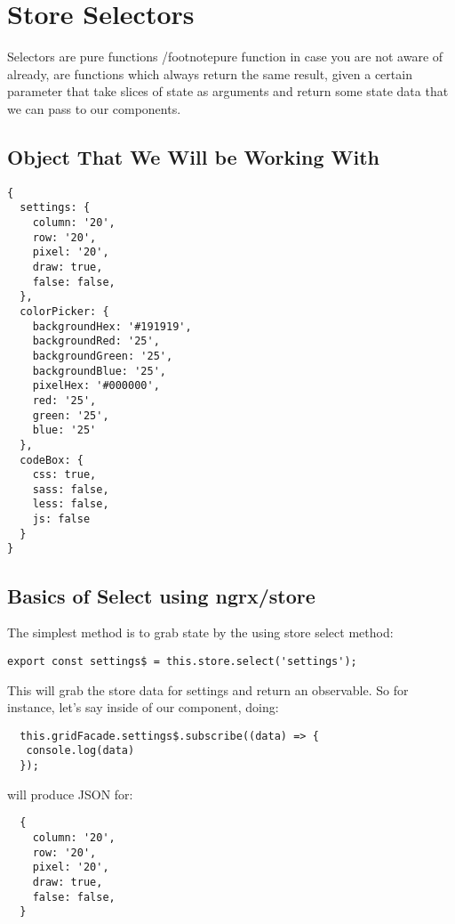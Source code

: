 \maketitle{}
\section{ Store Selectors }

Selectors are pure functions /footnote{pure function in case you are not aware
of already, are functions which always return the same result, given a certain
parameter} that take slices of state as arguments and return some state data
that we can pass to our components.


\subsection{Object That We Will be Working With}
\begin{verbatim}
{
  settings: {
    column: '20',
    row: '20',
    pixel: '20',
    draw: true,
    false: false,
  },
  colorPicker: {
    backgroundHex: '#191919',
    backgroundRed: '25',
    backgroundGreen: '25',
    backgroundBlue: '25',
    pixelHex: '#000000',
    red: '25',
    green: '25',
    blue: '25'
  },
  codeBox: {
    css: true,
    sass: false,
    less: false,
    js: false
  }
}
\end{verbatim}

\subsection{Basics of Select using ngrx/store}

The simplest method is to grab state by the using store select method:
\begin{lstlisting}
export const settings$ = this.store.select('settings');
\end{lstlisting}

This will grab the store data for settings and return an observable. So for
instance, let's say inside of our component, doing:
\begin{lstlisting}
  this.gridFacade.settings$.subscribe((data) => {
   console.log(data)
  });
\end{lstlisting}
 will produce JSON for:
\begin{verbatim}
  {
    column: '20',
    row: '20',
    pixel: '20',
    draw: true,
    false: false,
  }
\end{verbatim}
